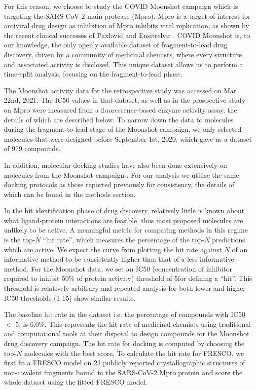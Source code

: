 For this reason, we choose to study the COVID Moonshot campaign \cite{Moonshot2022} which is targeting the SARS-CoV-2 main protease (Mpro). Mpro is a target of interest for antiviral drug design as inhibition of Mpro inhibits viral replication, as shown by the recent clinical successes of Paxlovid and Ensitrelvir \cite{Dafydd2021Paxlovid,unoh2022discovery}. COVID Moonshot is, to our knowledge, the only openly available dataset of fragment-to-lead drug discovery, driven by a community of medicinal chemists, where every structure and associated activity is disclosed. This unique dataset allows us to perform a time-split analysis, focusing on the fragment-to-lead phase.

The Moonshot activity data for the retrospective study was accessed on Mar 22nd, 2021. The IC50 values in that dataset, as well as in the prospective study on Mpro were measured from a fluorescence-based enzyme activity assay, the details of which are described below. To narrow down the data to molecules during the fragment-to-lead stage of the Moonshot campaign, we only selected molecules that were designed before September 1st, 2020, which gave us a dataset of 979 compounds.

In addition, molecular docking studies have also been done extensively on molecules from the Moonshot campaign \cite{Morris2021Rank, Saar2021biorxiv}. For our analysis we utilise the same docking protocols as those reported previously for consistency, the details of which can be found in the methods section.

In the hit identification phase of drug discovery, relatively little is known about what ligand-protein interactions are feasible, thus most proposed molecules are unlikely to be active. A meaningful metric for comparing methods in this regime is the top-$N$ ``hit rate'', which measures the percentage of the top-$N$ predictions which are active. We expect the curve from plotting the hit rate against $N$ of an informative method to be consistently higher than that of a less informative method. For the Moonshot data, we set an IC50 (concentration of inhibitor required to inhibit 50\% of protein activity) threshold of 5\uM for defining a ``hit''. This threshold is relatively arbitrary and repeated analysis for both lower and higher IC50 thresholds (1-15\uM) show similar results.

The baseline hit rate in the dataset i.e. the percentage of compounds with IC50 $<$ 5\uM, is 6.0\%. This represents the hit rate of medicinal chemists using traditional and computational tools at their disposal to design compounds for the Moonshot drug discovery campaign. The hit rate for docking is computed by choosing the top-$N$ molecules with the best score. To calculate the hit rate for FRESCO, we first fit a FRESCO model on 23 publicly reported crystallographic structures of non-covalent fragments bound to the SARS-CoV-2 Mpro protein \cite{Douangamath2020XChem} and score the whole dataset using the fitted FRESCO model.

